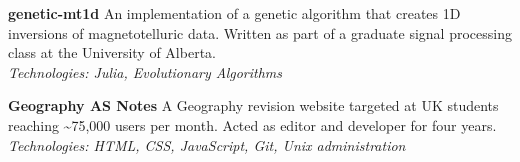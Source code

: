 \documentclass[11pt]{article}
\begin{document}
\medskip
\textbf{genetic-mt1d}  \newline
An implementation of a genetic algorithm that creates 1D inversions of
magnetotelluric data. Written as part of a graduate signal processing class at
the University of Alberta. \\
\emph{Technologies: Julia, Evolutionary Algorithms}

\medskip
\textbf{Geography AS Notes}  \newline
A Geography revision website targeted at UK students reaching
\textasciitilde{}75,000 users per month. Acted as editor and developer for
four years. \\
\emph{Technologies: HTML, CSS, JavaScript, Git, Unix administration}
\end{document}

